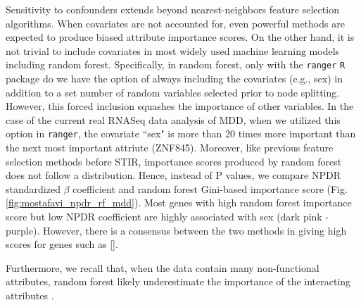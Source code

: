 \documentclass[10pt]{article}
\begin{document}
Sensitivity to confounders extends beyond nearest-neighbors feature selection algorithms.
When covariates are not accounted for, even powerful methods are expected to produce biased attribute importance scores.
On the other hand, it is not trivial to include covariates in most widely used machine learning models including random forest.
Specifically, in random forest, only with the \texttt{ranger} \texttt{R} package do we have the option of always including the covariates (e.g., sex) in addition to a set number of random variables selected prior to node splitting.
However, this forced inclusion squashes the importance of other variables.
In the case of the current real RNASeq data analysis of MDD, when we utilized this option in \texttt{ranger}, the covariate ``sex" is more than 20 times more important than the next most important attriute (ZNF845).
Moreover, like previous feature selection methods before STIR, importance scores produced by random forest does not follow a distribution.
Hence, instead of P values, we compare NPDR standardized $\beta$ coefficient and random forest Gini-based importance score (Fig. \ref{fig:mostafavi_npdr_rf_mdd}).
Most genes with high random forest importance score but low NPDR coefficient are highly associated with sex (dark pink - purple).
However, there is a consensus between the two methods in giving high scores for genes such as [].

Furthermore, we recall that, when the data contain many non-functional attributes, random forest likely underestimate the importance of the interacting attributes \cite{mckinney2009capturing,winham2012snp}.
\end{document}
